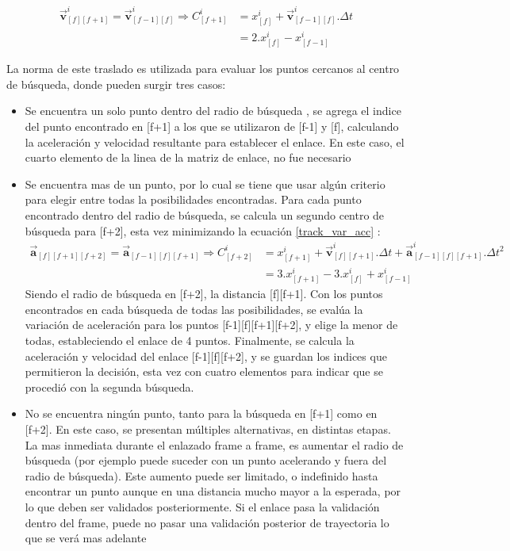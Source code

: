 \begin{equation}
\begin{split}
\boldsymbol{\overrightarrow{v}}_{[f][f+1]}^{i} = \boldsymbol{\overrightarrow{v}}_{[f-1][f]}^{i} \Rightarrow C_{[f+1]}^{i} &= x_{[f]}^{i} + \boldsymbol{\overrightarrow{v}}_{[f-1][f]}^{i}.\Delta{t} \\
&= 2.x_{[f]}^{i} -x_{[f-1]}^{i} 
\end{split}
\label{centro_busqueda_f1}
\end{equation}

La norma de este traslado es utilizada para evaluar los puntos cercanos al centro de búsqueda, donde pueden surgir tres casos:

\begin{itemize}
\item Se encuentra un solo punto dentro del radio de búsqueda , se agrega el indice del punto encontrado en [f+1] a los que se utilizaron de [f-1] y [f], calculando la aceleración y velocidad resultante para establecer el enlace. En este caso, el cuarto elemento de la linea de la matriz de enlace, no fue necesario 
\item Se encuentra mas de un punto, por lo cual se tiene que usar algún criterio para elegir entre todas la posibilidades encontradas. Para cada punto encontrado dentro del radio de búsqueda, se calcula un segundo centro de búsqueda para [f+2], esta vez minimizando la ecuación \ref{track_var_acc} :
\begin{equation}
\begin{split}
\boldsymbol{\overrightarrow{a}}_{[f][f+1][f+2]}=\boldsymbol{\overrightarrow{a}}_{[f-1][f][f+1]} \Rightarrow C_{[f+2]}^{i} &= x_{[f+1]}^{i} + \boldsymbol{\overrightarrow{v}}_{[f][f+1]}^{i}.\Delta{t} + \boldsymbol{\overrightarrow{a}}_{[f-1][f][f+1]}^{i}.\Delta{t}^2\\
&= 3.x_{[f+1]}^{i} - 3.x_{[f]}^{i} + x_{[f-1]}^{i}\end{split}
\label{centro_busqueda_f2}
\end{equation}
Siendo el radio de búsqueda en [f+2], la distancia [f][f+1]. Con los puntos encontrados en cada búsqueda de todas las posibilidades, se evalúa la variación de aceleración para los puntos [f-1][f][f+1][f+2], y elige la menor de todas, estableciendo el enlace de 4 puntos. Finalmente, se calcula la aceleración y velocidad del enlace [f-1][f][f+2], y se guardan los indices que permitieron la decisión, esta vez con cuatro elementos para indicar que se procedió con la segunda búsqueda.
\item No se encuentra ningún punto, tanto para la búsqueda en [f+1] como en [f+2]. En este caso, se presentan múltiples alternativas, en distintas etapas. La mas inmediata durante el enlazado frame a frame, es aumentar el radio de búsqueda (por ejemplo puede suceder con un punto acelerando y fuera del radio de búsqueda). Este aumento puede ser limitado, o indefinido hasta encontrar un punto aunque en una distancia mucho mayor a la esperada, por lo que deben ser validados posteriormente. Si el enlace pasa la validación dentro del frame, puede no pasar una validación posterior de trayectoria lo que se verá mas adelante
\end{itemize}

